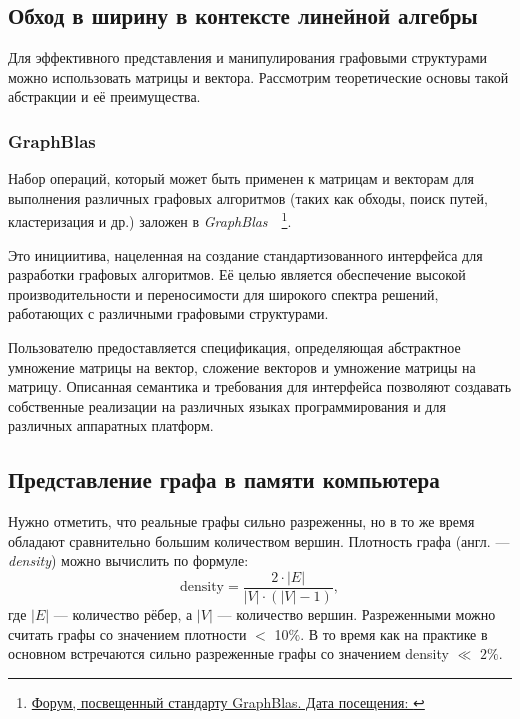 \subsection{Обход в ширину в контексте линейной алгебры}
\noindent Для эффективного представления и манипулирования графовыми структурами можно использовать матрицы и вектора. Рассмотрим теоретические основы такой  абстракции и её преимущества.



\subsubsection*{GraphBlas}
\noindent Набор операций, который может быть применен к матрицам и векторам для выполнения различных графовых алгоритмов (таких как обходы, поиск путей, кластеризация и др.) заложен в \textit{GraphBlas}~\cite{gb_math}~\footnote{\href{https://graphblas.org/}{Форум, посвещенный стандарту GraphBlas. Дата посещения: }}.

Это инициитива, нацеленная на создание стандартизованного интерфейса для разработки графовых алгоритмов. Её целью является обеспечение высокой производительности и переносимости для широкого спектра решений, работающих с различными графовыми структурами.

Пользователю предоставляется спецификация, определяющая абстрактное умножение матрицы на вектор, сложение векторов и умножение матрицы на матрицу. Описанная семантика и требования для интерфейса позволяют создавать собственные реализации на различных языках программирования и для различных аппаратных платформ. 



\subsection{Представление графа в памяти компьютера}
\noindent Нужно отметить, что реальные графы сильно разреженны, но в то же время обладают сравнительно большим количеством вершин.
Плотность графа (англ. --- \textit{density}) можно вычислить по формуле: 
\begin{equation}
\label{eq:density}
	\text{density} = \frac{2 \cdot \big| E \big| }{\big| V \big| \cdot (\big| V \big| - 1)},
\end{equation}
где $\big| E \big|$ --- {количество рёбер}, а $\big| V \big|$ --- количество вершин.\linebreak
Разреженными можно считать графы со значением плотности $<$ 10$\%$. В то время как на практике в основном встречаются сильно разреженные графы со значением density $\ll$ $2\%$. 


